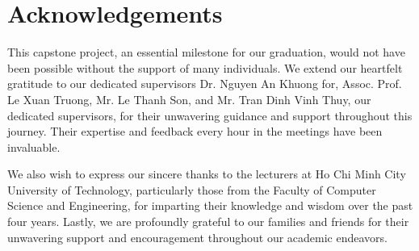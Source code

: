 \chapter*{Acknowledgements}

This capstone project, an essential milestone for our graduation, would not have been possible without the support of many individuals. We extend our heartfelt gratitude to our dedicated supervisors Dr. Nguyen An Khuong for, Assoc. Prof. Le Xuan Truong, Mr. Le Thanh Son, and Mr. Tran Dinh Vinh Thuy, our dedicated supervisors, for their unwavering guidance and support throughout this journey. Their expertise and feedback every hour in the meetings have been invaluable.

We also wish to express our sincere thanks to the lecturers at Ho Chi Minh City University of Technology, particularly those from the Faculty of Computer Science and Engineering, for imparting their knowledge and wisdom over the past four years. Lastly, we are profoundly grateful to our families and friends for their unwavering support and encouragement throughout our academic endeavors.
